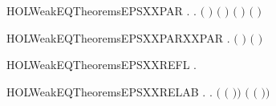 \begin{SaveVerbatim}{HOLWeakEQTheoremsEPSXXPAR}
\HOLTokenTurnstile{} \HOLSymConst{\HOLTokenForall{}} .
          \HOLSymConst{\HOLTokenImp{}}
       \HOLSymConst{\HOLTokenForall{}}.  \ensuremath{(} \HOLSymConst{\ensuremath{\mid}} \ensuremath{)} \ensuremath{(} \HOLSymConst{\ensuremath{\mid}} \ensuremath{)} \HOLSymConst{\HOLTokenConj{}}  \ensuremath{(} \HOLSymConst{\ensuremath{\mid}} \ensuremath{)} \ensuremath{(} \HOLSymConst{\ensuremath{\mid}} \ensuremath{)}
\end{SaveVerbatim}
\newcommand{\HOLWeakEQTheoremsEPSXXPAR}{\UseVerbatim{HOLWeakEQTheoremsEPSXXPAR}}
\begin{SaveVerbatim}{HOLWeakEQTheoremsEPSXXPARXXPAR}
\HOLTokenTurnstile{} \HOLSymConst{\HOLTokenForall{}}   .    \HOLSymConst{\HOLTokenConj{}}    \HOLSymConst{\HOLTokenImp{}}  \ensuremath{(} \HOLSymConst{\ensuremath{\mid}} \ensuremath{)} \ensuremath{(} \HOLSymConst{\ensuremath{\mid}} \ensuremath{)}
\end{SaveVerbatim}
\newcommand{\HOLWeakEQTheoremsEPSXXPARXXPAR}{\UseVerbatim{HOLWeakEQTheoremsEPSXXPARXXPAR}}
\begin{SaveVerbatim}{HOLWeakEQTheoremsEPSXXREFL}
\HOLTokenTurnstile{} \HOLSymConst{\HOLTokenForall{}}.   
\end{SaveVerbatim}
\newcommand{\HOLWeakEQTheoremsEPSXXREFL}{\UseVerbatim{HOLWeakEQTheoremsEPSXXREFL}}
\begin{SaveVerbatim}{HOLWeakEQTheoremsEPSXXRELAB}
\HOLTokenTurnstile{} \HOLSymConst{\HOLTokenForall{}} .
          \HOLSymConst{\HOLTokenImp{}}
       \HOLSymConst{\HOLTokenForall{}}.  \ensuremath{(}  \ensuremath{(} \ensuremath{)}\ensuremath{)} \ensuremath{(}  \ensuremath{(} \ensuremath{)}\ensuremath{)}
\end{SaveVerbatim}
